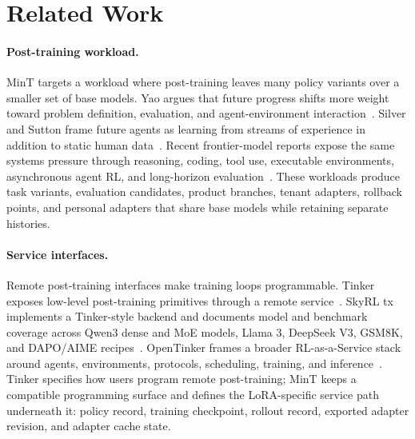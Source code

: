 \documentclass{llmxive}
\begin{document}
\section{Related Work}
\label{sec:related}

\paragraph{Post-training workload.}
MinT targets a workload where post-training leaves many policy variants over a smaller set of base models. Yao argues that future progress shifts more weight toward problem definition, evaluation, and agent-environment interaction~\citep{yao_second_half_2025}. Silver and Sutton frame future agents as learning from streams of experience in addition to static human data~\citep{silver_sutton_experience_2025}. Recent frontier-model reports expose the same systems pressure through reasoning, coding, tool use, executable environments, asynchronous agent RL, and long-horizon evaluation~\citep{deepseek_v4_release_2026,deepseekv4_2026,glm5_2026,kimi_k25_2026,minimax_m27_2026,qwen35_2026,openai_gpt55_2026,anthropic_opus45_2025,anthropic_agent_autonomy_2026}. These workloads produce task variants, evaluation candidates, product branches, tenant adapters, rollback points, and personal adapters that share base models while retaining separate histories.

\paragraph{Service interfaces.}
Remote post-training interfaces make training loops programmable. Tinker exposes low-level post-training primitives through a remote service~\citep{tinker2025,tinker_cookbook}. SkyRL tx implements a Tinker-style backend and documents model and benchmark coverage across Qwen3 dense and MoE models, Llama 3, DeepSeek V3, GSM8K, and DAPO/AIME recipes~\citep{skyrl_tx}. OpenTinker frames a broader RL-as-a-Service stack around agents, environments, protocols, scheduling, training, and inference~\citep{opentinker2026}. Tinker specifies how users program remote post-training; MinT keeps a compatible programming surface and defines the LoRA-specific service path underneath it: policy record, training checkpoint, rollout record, exported adapter revision, and adapter cache state.
\end{document}

